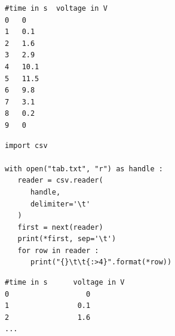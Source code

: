 
\begin{frame}[fragile]
%
\begin{tcbraster}[raster columns=2,
                  raster equal height,
                  nobeforeafter,
                  raster column skip=0.2cm]
\begin{cmdbox}
\begin{verbatim}
#time in s	voltage in V
0	0
1	0.1
2	1.6
3	2.9
4	10.1
5	11.5
6	9.8
7	3.1
8	0.2
9	0
\end{verbatim}
\end{cmdbox}
%
\begin{codebox}
\begin{verbatim}
import csv

with open("tab.txt", "r") as handle :
   reader = csv.reader(
      handle,
      delimiter='\t'
   )
   first = next(reader)
   print(*first, sep='\t')
   for row in reader :
      print("{}\t\t{:>4}".format(*row))
\end{verbatim}
\end{codebox}
\end{tcbraster}
%
\begin{cmdbox}
\begin{verbatim}
#time in s      voltage in V
0                  0
1                0.1
2                1.6
...
\end{verbatim}
\end{cmdbox}
%
\end{frame}


